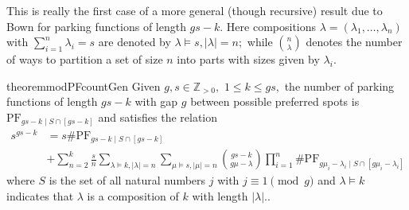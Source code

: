 \documentclass[12 pt]{amsart}
\theoremstyle{definition} %
\theoremstyle{remark} %
\begin{document}
This is really the first case of a more general (though recursive) result due to Bown for parking functions of length $gs - k$. Here compositions $\lambda = (\lambda_{1}, \dots, \lambda_{n})$ with $\sum_{i = 1}^{n} \lambda_{i} = s$ are denoted by $\lambda\vDash s, \lvert\lambda\rvert = n;$ while $\binom{n}{\lambda}$ denotes the number of ways to partition a set of size $n$ into parts with sizes given by $\lambda_i$.

\begin{restatable}{theorem}{modPFcountGen}
	Given $g,s\in\mathbb{Z}_{>0},$ $1\le k\le gs,$ the number of parking functions of length $gs - k$ with gap $g$ between possible preferred spots is $\mathrm{PF}_{gs - k \mid S \cap [gs - k]}$ and satisfies the relation
	\begin{align*}
		s^{gs - k} & = s \# \mathrm{PF}_{gs - k \mid S \cap [gs - k]} \\
			   & + \sum_{n = 2}^{k} \frac{s}{n} \sum_{\lambda \vDash k, \lvert \lambda \rvert = n} \sum_{\mu \vDash s, \lvert \mu \rvert = n} \binom{gs - k}{g \mu - \lambda} \prod_{i = 1}^{n} \# \mathrm{PF}_{g \mu_{i} - \lambda_{i} \mid S \cap [g \mu_{i} - \lambda_{i}]}
	\end{align*}
	where $S$ is the set of all natural numbers $j$ with $j \equiv 1 \pmod g$ and $\lambda \vDash k$ indicates that $\lambda$ is a composition of $k$ with length $|\lambda|.$.
\end{restatable}
\end{document}
